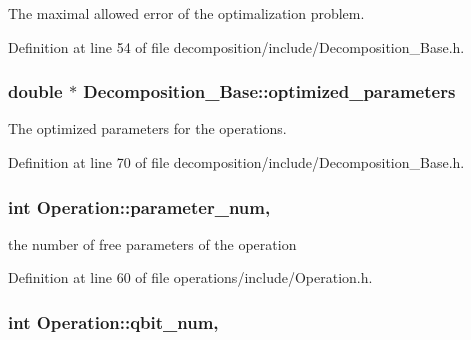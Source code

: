The maximal allowed error of the optimalization problem. 



Definition at line 54 of file decomposition/include/\+Decomposition\+\_\+\+Base.\+h.

\subsubsection[{\texorpdfstring{optimized\+\_\+parameters}{optimized_parameters}}]{\setlength{\rightskip}{0pt plus 5cm}double $\ast$ Decomposition\+\_\+\+Base\+::optimized\+\_\+parameters\hspace{0.3cm}{\ttfamily [protected]}}\hypertarget{class_decomposition___base_a38bb2fae99a99736eaafbf9741eb2f5d}{}\label{class_decomposition___base_a38bb2fae99a99736eaafbf9741eb2f5d}


The optimized parameters for the operations. 



Definition at line 70 of file decomposition/include/\+Decomposition\+\_\+\+Base.\+h.

\subsubsection[{\texorpdfstring{parameter\+\_\+num}{parameter_num}}]{\setlength{\rightskip}{0pt plus 5cm}int Operation\+::parameter\+\_\+num\hspace{0.3cm}{\ttfamily [protected]}, {\ttfamily [inherited]}}\hypertarget{class_operation_aa57505afe5b5ec27f6d053044b86e043}{}\label{class_operation_aa57505afe5b5ec27f6d053044b86e043}


the number of free parameters of the operation 



Definition at line 60 of file operations/include/\+Operation.\+h.

\subsubsection[{\texorpdfstring{qbit\+\_\+num}{qbit_num}}]{\setlength{\rightskip}{0pt plus 5cm}int Operation\+::qbit\+\_\+num\hspace{0.3cm}{\ttfamily [protected]}, {\ttfamily [inherited]}}\hypertarget{class_operation_aecd5fbf1dd4ea532b2e58471ff8bad69}{}\label{class_operation_aecd5fbf1dd4ea532b2e58471ff8bad69}


